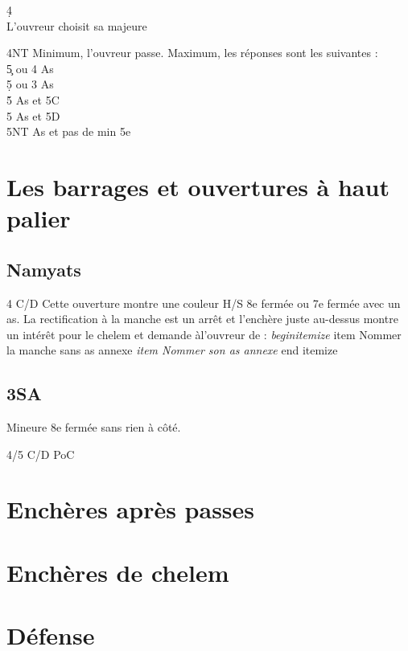 \documentclass[a4paper]{article}
\begin{document}
\begin{bidtable}
4\d\+\\
L'ouvreur \> choisit sa majeure\-
\end{bidtable}

\begin{bidtable}
4NT \> Minimum, l'ouvreur passe. Maximum, les réponses sont les suivantes :\+\\
5\c {} ou 4 As\\
5\d {} ou 3 As\\
5\h {} As et 5C\\
5\s {} As et 5D\\
5NT  As et pas de min 5e\-
\end{bidtable}

\section{Les barrages et ouvertures à haut palier}

\subsection{Namyats}

4 C/D Cette ouverture montre une couleur H/S 8e fermée ou 7e fermée avec un as.
La rectification à la manche est un arrêt et l'enchère juste au-dessus montre un intérêt pour le chelem et demande àl'ouvreur de :
\emph{begin{itemize}
}item Nommer la manche sans as annexe
\emph{item Nommer son as annexe
}end {itemize}

\subsection{3SA}

Mineure 8e fermée sans rien à côté.

4/5 C/D PoC

\section{Enchères après passes}

\section{Enchères de chelem}

\section{Défense}
\end{document}
